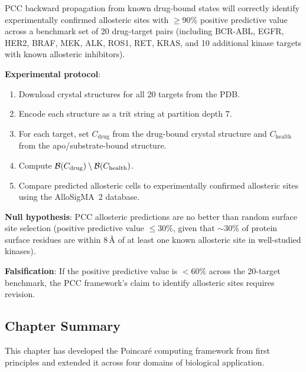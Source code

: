 \begin{prediction}
\label{pred:ch05-allosteric}
PCC backward propagation from known drug-bound states will correctly
identify experimentally confirmed allosteric sites with $\geq 90\%$
positive predictive value across a benchmark set of 20 drug-target pairs
(including BCR-ABL, EGFR, HER2, BRAF, MEK, ALK, ROS1, RET, KRAS, and
10 additional kinase targets with known allosteric inhibitors).

\medskip
\textbf{Experimental protocol}:
\begin{enumerate}
    \item Download crystal structures for all 20 targets from the PDB.
    \item Encode each structure as a trit string at partition depth 7.
    \item For each target, set $C_{\mathrm{drug}}$ from the drug-bound
          crystal structure and $C_{\mathrm{health}}$ from the
          apo/substrate-bound structure.
    \item Compute $\mathcal{B}(C_{\mathrm{drug}}) \setminus \mathcal{B}(C_{\mathrm{health}})$.
    \item Compare predicted allosteric cells to experimentally confirmed
          allosteric sites using the AlloSigMA~2 database.
\end{enumerate}

\textbf{Null hypothesis}: PCC allosteric predictions are no better than
random surface site selection (positive predictive value $\leq 30\%$,
given that $\sim 30\%$ of protein surface residues are within 8\,\AA{}
of at least one known allosteric site in well-studied kinases).

\textbf{Falsification}: If the positive predictive value is $< 60\%$
across the 20-target benchmark, the PCC framework's claim to identify
allosteric sites requires revision.
\end{prediction}

\subsection{Chapter Summary}

This chapter has developed the Poincaré computing framework from first
principles and extended it across four domains of biological application.

